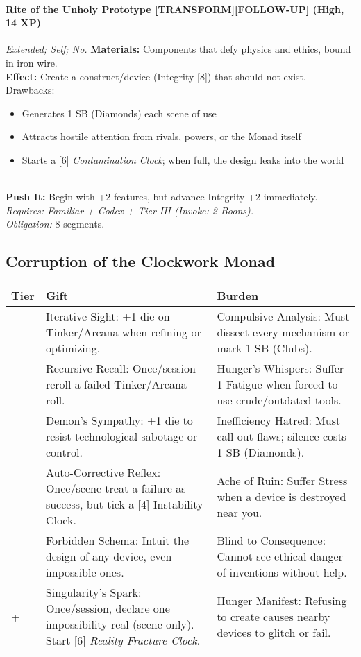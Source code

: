 \paragraph{Rite of the Unholy Prototype \textnormal{[TRANSFORM][FOLLOW-UP]} (High, 14 XP)} \emph{Extended; Self; No.}  
\textbf{Materials:} Components that defy physics and ethics, bound in iron wire.\\
\textbf{Effect:} Create a construct/device (Integrity [8]) that should not exist. Drawbacks:  
\begin{itemize}
  \item Generates 1 SB (Diamonds) each scene of use  
  \item Attracts hostile attention from rivals, powers, or the Monad itself  
  \item Starts a [6] \emph{Contamination Clock}; when full, the design leaks into the world  
\end{itemize}\\
\textbf{Push It:} Begin with +2 features, but advance Integrity +2 immediately.\\
\emph{Requires: Familiar + Codex + Tier III (\textit{Invoke:} 2 Boons).}\\
\emph{Obligation:} 8 segments.


\subsection*{Corruption of the Clockwork Monad}
\label{sec:monad-corruption}

\begin{longtable}{>{\raggedright\arraybackslash}p{1cm} p{5cm} p{5cm}}
\toprule
\textbf{Tier} & \textbf{Gift} & \textbf{Burden} \\
\midrule
1 & Iterative Sight: +1 die on Tinker/Arcana when refining or optimizing. & Compulsive Analysis: Must dissect every mechanism or mark 1 SB (Clubs). \\
\midrule
2 & Recursive Recall: Once/session reroll a failed Tinker/Arcana roll. & Hunger’s Whispers: Suffer 1 Fatigue when forced to use crude/outdated tools. \\
\midrule
3 & Demon’s Sympathy: +1 die to resist technological sabotage or control. & Inefficiency Hatred: Must call out flaws; silence costs 1 SB (Diamonds). \\
\midrule
4 & Auto-Corrective Reflex: Once/scene treat a failure as success, but tick a [4] Instability Clock. & Ache of Ruin: Suffer Stress when a device is destroyed near you. \\
\midrule
5 & Forbidden Schema: Intuit the design of any device, even impossible ones. & Blind to Consequence: Cannot see ethical danger of inventions without help. \\
\midrule
6+ & Singularity’s Spark: Once/session, declare one impossibility real (scene only). Start [6] \emph{Reality Fracture Clock}. & Hunger Manifest: Refusing to create causes nearby devices to glitch or fail. \\
\bottomrule
\end{longtable}